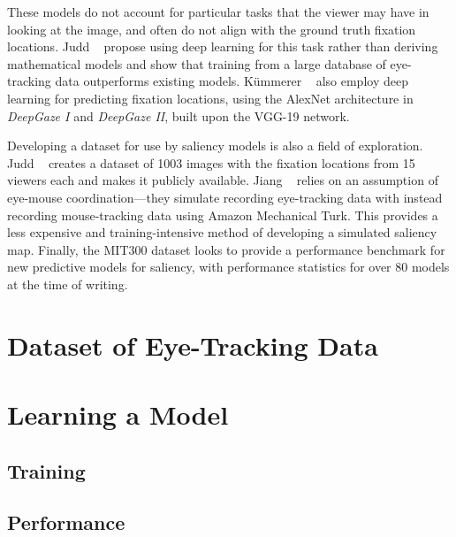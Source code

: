 \documentclass[10pt,twocolumn,letterpaper]{article}
\begin{document}
These models do not account for particular tasks that the viewer may have in
looking at the image, and often do not align with the ground truth fixation
locations. Judd \etal~\cite{Judd} propose using deep learning for this task
rather than deriving mathematical models and show that training from a large
database of eye-tracking data outperforms existing models. K\"ummerer
\etal~\cite{Kummerer} also employ deep learning for predicting fixation
locations, using the AlexNet architecture in \textit{DeepGaze I} and \textit{DeepGaze II}, built upon the VGG-19 network.

Developing a dataset for use by saliency models is also a field of exploration.
Judd \etal~\cite{Judd} creates a dataset of 1003 images with the fixation
locations from 15 viewers each and makes it publicly available. Jiang
\etal~\cite{Jiang} relies on an assumption of eye-mouse coordination---they
simulate recording eye-tracking data with instead recording mouse-tracking data
using Amazon Mechanical Turk. This provides a less expensive and
training-intensive method of developing a simulated saliency map. Finally, the
MIT300 dataset \cite{mitbench} looks to provide a performance benchmark for new predictive
models for saliency, with performance statistics for over 80 models at the time
of writing. 


\section{Dataset of Eye-Tracking Data}
\section{Learning a Model}
\subsection{Training}

\subsection{Performance}
\end{document}
